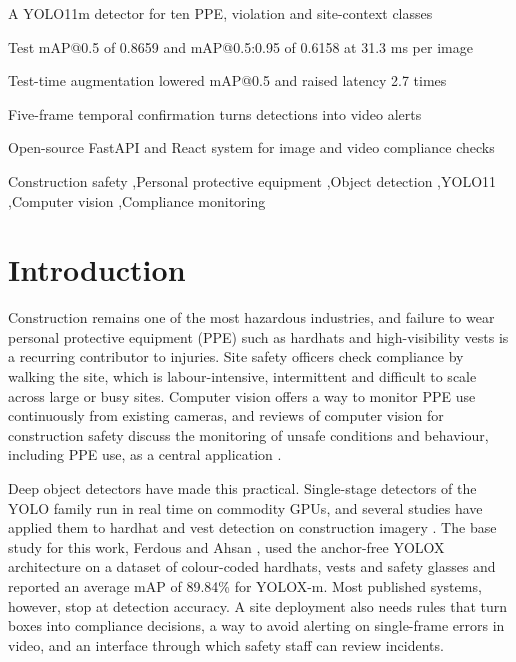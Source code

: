 \documentclass[preprint,12pt]{elsarticle}
\begin{document}
\begin{frontmatter}
\begin{highlights}
\item A YOLO11m detector for ten PPE, violation and site-context classes
\item Test mAP@0.5 of 0.8659 and mAP@0.5:0.95 of 0.6158 at 31.3 ms per image
\item Test-time augmentation lowered mAP@0.5 and raised latency 2.7 times
\item Five-frame temporal confirmation turns detections into video alerts
\item Open-source FastAPI and React system for image and video compliance checks
\end{highlights}

\begin{keyword}
Construction safety \sep Personal protective equipment \sep Object detection \sep YOLO11 \sep Computer vision \sep Compliance monitoring
\end{keyword}

\end{frontmatter}

\section{Introduction}
\label{sec:intro}

Construction remains one of the most hazardous industries, and failure to wear personal protective equipment (PPE) such as hardhats and high-visibility vests is a recurring contributor to injuries. Site safety officers check compliance by walking the site, which is labour-intensive, intermittent and difficult to scale across large or busy sites. Computer vision offers a way to monitor PPE use continuously from existing cameras, and reviews of computer vision for construction safety discuss the monitoring of unsafe conditions and behaviour, including PPE use, as a central application \cite{seo2015cv,fang2020behaviour}.

Deep object detectors have made this practical. Single-stage detectors of the YOLO family \cite{redmon2016yolo} run in real time on commodity GPUs, and several studies have applied them to hardhat and vest detection on construction imagery \cite{nath2020ppe,wu2019hardhat,wang2021ppe}. The base study for this work, Ferdous and Ahsan \cite{ferdous2022ppe}, used the anchor-free YOLOX architecture on a dataset of colour-coded hardhats, vests and safety glasses and reported an average mAP of 89.84\% for YOLOX-m. Most published systems, however, stop at detection accuracy. A site deployment also needs rules that turn boxes into compliance decisions, a way to avoid alerting on single-frame errors in video, and an interface through which safety staff can review incidents.
\end{document}
